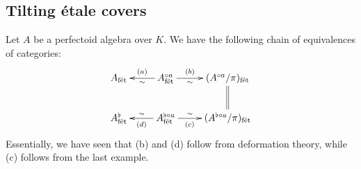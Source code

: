 \subsection{Tilting \'etale covers}

Let $A$ be a perfectoid algebra over $K$. We have the following chain of 
equivalences of categories: 
\[\xymatrix{
  A_\fet
    & \ar[l]^-\sim_-{(a)} A^{\circ a}_\fet \ar[r]_-\sim^-{(b)} 
    & (A^{\circ a}/\pi)_\fet \ar@{=}[d] \\
  A^\flat_\fet
    & \ar[l]_-\sim^-{(d)} A^{\flat\circ a}_\fet \ar[r]^-\sim_-{(c)} 
    & (A^{\flat\circ a}/\pi)_\fet
}\]
Essentially, we have seen that (b) and (d) follow from deformation theory, 
while (c) follows from the last example. 
